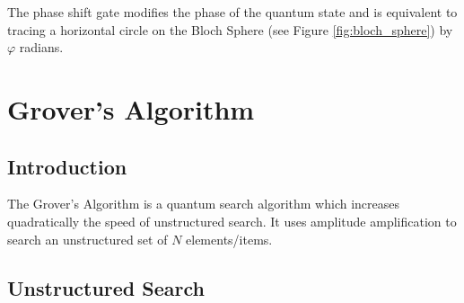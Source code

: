 \documentclass{article}
\begin{document}
\noindent
The phase shift gate modifies the phase of the quantum state and is equivalent to tracing a horizontal circle on the Bloch Sphere (see Figure \ref{fig:bloch_sphere}) by $\varphi$ radians\cite{noauthor_quantum_nodate}. 

\pagebreak

\section{Grover's Algorithm}
\subsection{Introduction}

The Grover's Algorithm is a quantum search algorithm which increases quadratically the speed of unstructured search\cite{noauthor_grovers_nodate}. It uses  amplitude amplification to search an unstructured set of $N$ elements/items. 

\subsection{Unstructured Search}
\vspace{10mm}
\end{document}
